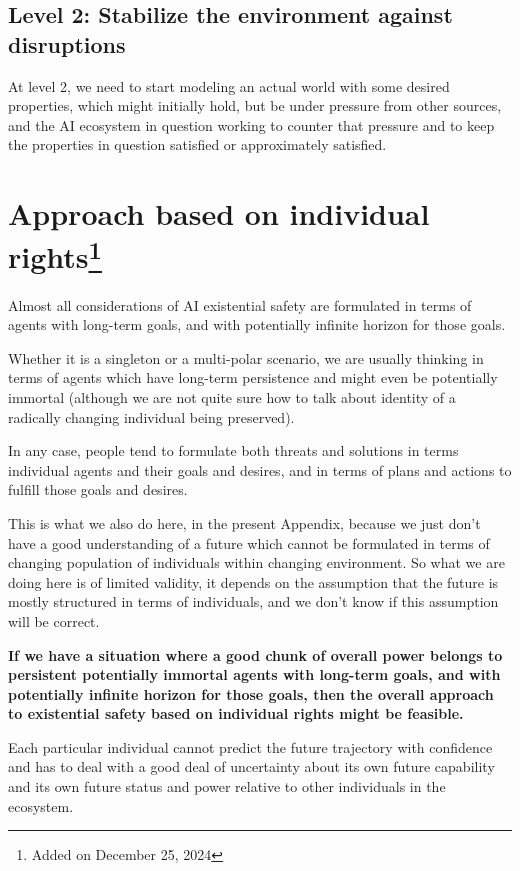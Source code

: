 \documentclass{article}
\begin{document}
\subsection{Level 2: Stabilize the environment against disruptions}

At level 2, we need to start modeling an actual world with some desired properties, which might
initially hold, but be under pressure from other sources, and the AI ecosystem in question working
to counter that pressure and to keep the properties in question satisfied or approximately satisfied.

\section[Approach based on individual rights]{Approach based on individual rights\footnote{Added on December 25, 2024}}\label{sec:individuals}
Almost all considerations of AI existential safety are formulated in terms of agents with
long-term goals, and with potentially infinite horizon for those goals. 

Whether it is a singleton or a multi-polar scenario, we are usually thinking in terms of
agents which have long-term persistence and might even be potentially immortal
(although we are not quite sure how to talk about identity of a radically changing
individual being preserved).

In any case, people tend to formulate both threats and solutions in terms individual agents
and their goals and desires, and in terms of plans and actions to fulfill those goals and desires.

This is what we also do here, in the present Appendix, because we just don't have a good understanding of
a future which cannot be formulated in terms of changing population of individuals within
changing environment. So what we are doing here is of limited validity, it depends
on the assumption that the future is mostly structured in terms of individuals, and we don't know
if this assumption will be correct.

{\bf If we have a situation where a good chunk of overall power belongs to persistent
potentially immortal agents with long-term goals, and with potentially infinite horizon for those goals,
then the overall approach to existential safety based on individual rights might be feasible.}

Each particular individual cannot predict the future trajectory with confidence and has to deal with
a good deal of uncertainty about its own future capability and its own future status and power relative to
other individuals in the ecosystem.
\end{document}
